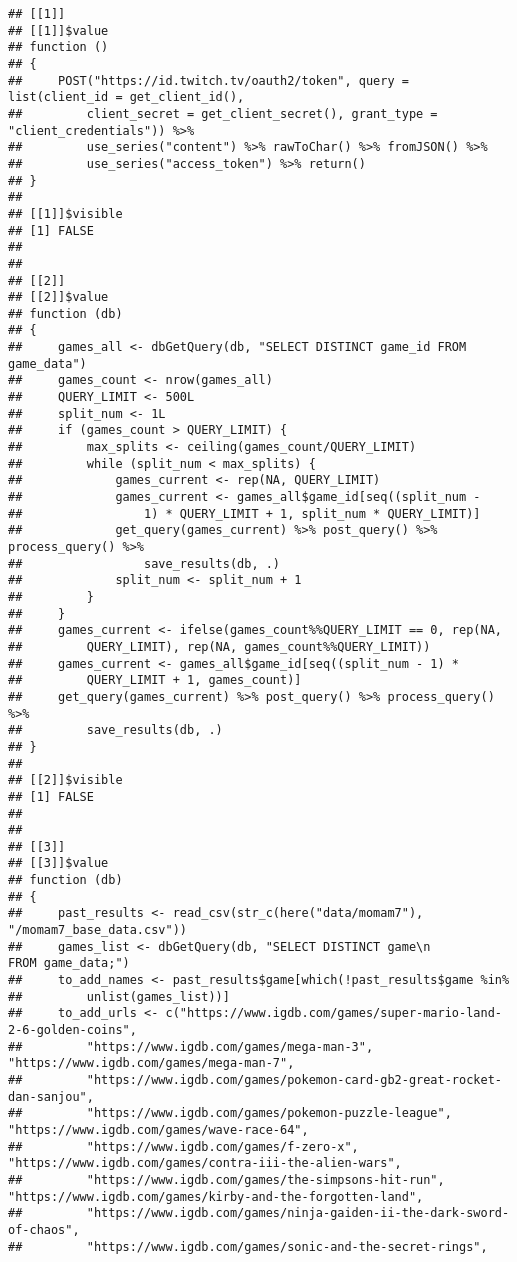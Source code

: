 \documentclass[
]{article}
\begin{document}
\begin{verbatim}
## [[1]]
## [[1]]$value
## function () 
## {
##     POST("https://id.twitch.tv/oauth2/token", query = list(client_id = get_client_id(), 
##         client_secret = get_client_secret(), grant_type = "client_credentials")) %>% 
##         use_series("content") %>% rawToChar() %>% fromJSON() %>% 
##         use_series("access_token") %>% return()
## }
## 
## [[1]]$visible
## [1] FALSE
## 
## 
## [[2]]
## [[2]]$value
## function (db) 
## {
##     games_all <- dbGetQuery(db, "SELECT DISTINCT game_id FROM game_data")
##     games_count <- nrow(games_all)
##     QUERY_LIMIT <- 500L
##     split_num <- 1L
##     if (games_count > QUERY_LIMIT) {
##         max_splits <- ceiling(games_count/QUERY_LIMIT)
##         while (split_num < max_splits) {
##             games_current <- rep(NA, QUERY_LIMIT)
##             games_current <- games_all$game_id[seq((split_num - 
##                 1) * QUERY_LIMIT + 1, split_num * QUERY_LIMIT)]
##             get_query(games_current) %>% post_query() %>% process_query() %>% 
##                 save_results(db, .)
##             split_num <- split_num + 1
##         }
##     }
##     games_current <- ifelse(games_count%%QUERY_LIMIT == 0, rep(NA, 
##         QUERY_LIMIT), rep(NA, games_count%%QUERY_LIMIT))
##     games_current <- games_all$game_id[seq((split_num - 1) * 
##         QUERY_LIMIT + 1, games_count)]
##     get_query(games_current) %>% post_query() %>% process_query() %>% 
##         save_results(db, .)
## }
## 
## [[2]]$visible
## [1] FALSE
## 
## 
## [[3]]
## [[3]]$value
## function (db) 
## {
##     past_results <- read_csv(str_c(here("data/momam7"), "/momam7_base_data.csv"))
##     games_list <- dbGetQuery(db, "SELECT DISTINCT game\n           FROM game_data;")
##     to_add_names <- past_results$game[which(!past_results$game %in% 
##         unlist(games_list))]
##     to_add_urls <- c("https://www.igdb.com/games/super-mario-land-2-6-golden-coins", 
##         "https://www.igdb.com/games/mega-man-3", "https://www.igdb.com/games/mega-man-7", 
##         "https://www.igdb.com/games/pokemon-card-gb2-great-rocket-dan-sanjou", 
##         "https://www.igdb.com/games/pokemon-puzzle-league", "https://www.igdb.com/games/wave-race-64", 
##         "https://www.igdb.com/games/f-zero-x", "https://www.igdb.com/games/contra-iii-the-alien-wars", 
##         "https://www.igdb.com/games/the-simpsons-hit-run", "https://www.igdb.com/games/kirby-and-the-forgotten-land", 
##         "https://www.igdb.com/games/ninja-gaiden-ii-the-dark-sword-of-chaos", 
##         "https://www.igdb.com/games/sonic-and-the-secret-rings", 

\end{verbatim}
\end{document}
